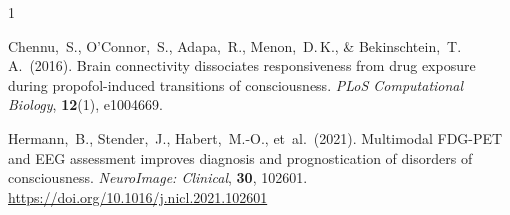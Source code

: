 \documentclass[11pt,a4paper]{article}
\theoremstyle{plain}
\theoremstyle{definition}
\theoremstyle{remark}
\begin{document}
\begin{thebibliography}{1}

Chennu,~S., O'Connor,~S., Adapa,~R., Menon,~D.\,K., \& Bekinschtein,~T.\,A.\ (2016).
Brain connectivity dissociates responsiveness from drug exposure during propofol-induced transitions of consciousness.
\textit{PLoS Computational Biology}, \textbf{12}(1), e1004669.

Hermann,~B., Stender,~J., Habert,~M.-O., et~al.\ (2021).
Multimodal FDG-PET and EEG assessment improves diagnosis and prognostication of disorders of consciousness.
\textit{NeuroImage: Clinical}, \textbf{30}, 102601.
\url{https://doi.org/10.1016/j.nicl.2021.102601}

\end{thebibliography}
\end{document}
